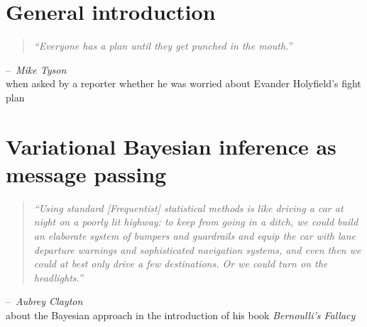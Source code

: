\documentclass[russian,dutch,english,b5paper,10pt]{book}
\newcommand{\bdv}[2][] {\todo[inline,backgroundcolor=blue!20!white, #1]{(bdv) #2}}
\begin{document}
\frontmatter\stopthumb





\cleardoublepage

\cleardoublepage



% 


\tableofcontents



\mainmatter

\null\thispagestyle{empty}\stopthumb 
 \chapter{General introduction} 
\label{chapter-01}
\begin{quote}
  \emph{``Everyone has a plan until they get punched in the mouth.''}
\end{quote}
\null\hfill--~\textit{Mike Tyson} \\
\null\hfill\small{when asked by a reporter whether he was worried about Evander Holyfield's fight plan}







\null\thispagestyle{empty}\stopthumb 
 
\chapter{Variational Bayesian inference as message passing} \label{chapter-02}
\begin{quote}
  \emph{``Using standard [Frequentist] statistical methods is like driving a car at night on a poorly lit highway: to keep from going in a ditch, we could build an elaborate system of bumpers and guardrails and equip the car with lane departure warnings and sophisticated navigation systems, and even then we could at best only drive a few destinations. Or we could turn on the headlights.''}
\end{quote}
\null\hfill --~\textit{Aubrey Clayton}\\
\null\hfill\small{about the Bayesian approach in the introduction of his book \textit{Bernoulli's Fallacy}}
\end{document}

